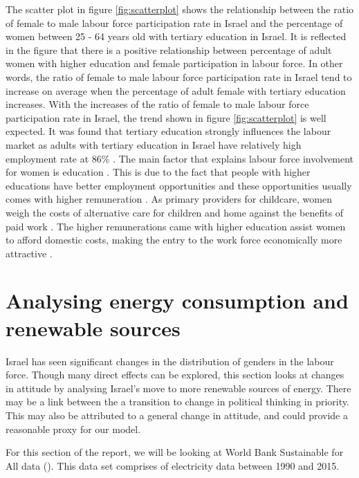 \documentclass[11pt,a4paper,]{article}
\begin{document}
The scatter plot in figure \ref{fig:scatterplot} shows the relationship between the ratio of female to male labour force participation rate in Israel and the percentage of women between 25 - 64 years old with tertiary education in Israel. It is reflected in the figure that there is a positive relationship between percentage of adult women with higher education and female participation in labour force. In other words, the ratio of female to male labour force participation rate in Israel tend to increase on average when the percentage of adult female with tertiary education increases. With the increases of the ratio of female to male labour force participation rate in Israel, the trend shown in figure \ref{fig:scatterplot} is well expected. It was found that tertiary education strongly influences the labour market as adults with tertiary education in Israel have relatively high employment rate at 86\% \autocite{oecd2016}. The main factor that explains labour force involvement for women is education \autocite{Stier2013}. This is due to the fact that people with higher educations have better employment opportunities and these opportunities usually comes with higher remuneration \autocite{pm2014}. As primary providers for childcare, women weigh the costs of alternative care for children and home against the benefits of paid work \autocite{Stier2013}. The higher remunerations came with higher education assist women to afford domestic costs, making the entry to the work force economically more attractive \autocite{pm2014}.

\section*{Analysing energy consumption and renewable sources}

Israel has seen significant changes in the distribution of genders in the labour force. Though many direct effects can be explored, this section looks at changes in attitude by analysing Israel's move to more renewable sources of energy. There may be a link between the a transition to change in political thinking in priority. This may also be attributed to a general change in attitude, and could provide a reasonable proxy for our model.

For this section of the report, we will be looking at World Bank Sustainable for All data (\textcite{TheWorldBank2018}). This data set comprises of electricity data between 1990 and 2015.
\end{document}
